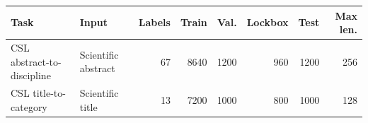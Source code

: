 \small
\setlength{\tabcolsep}{3.5pt}
\begin{tabular}{@{}llrrrrrr@{}}
\toprule
Task & Input & Labels & Train & Val. & Lockbox & Test & Max len. \\
\midrule
CSL abstract-to-discipline & Scientific abstract & 67 & 8640 & 1200 & 960 & 1200 & 256 \\
CSL title-to-category & Scientific title & 13 & 7200 & 1000 & 800 & 1000 & 128 \\
\bottomrule
\end{tabular}

